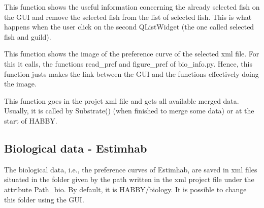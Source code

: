 \documentclass[letterpaper,10pt,english]{sphinxmanual}
\begin{document}
\begin{fulllineitems}
\begin{fulllineitems}
\end{fulllineitems}


\begin{fulllineitems}
\label{\detokenize{index:src_GUI.bio_info_GUI.BioInfo.show_info_fish_sel}}
This function shows the useful information concerning the already selected fish on the GUI and
remove the selected fish from the list of selected fish. This is what happens when the user click on the
second QListWidget (the one called selected fish and guild).

\end{fulllineitems}


\begin{fulllineitems}
\label{\detokenize{index:src_GUI.bio_info_GUI.BioInfo.show_pref}}
This function shows the image of the preference curve of the selected xml file. For this it calls, the functions
read\_pref and figure\_pref of bio\_info.py. Hence, this function justs makes the link between the GUI and
the functions effectively doing the image.

\end{fulllineitems}


\begin{fulllineitems}
\label{\detokenize{index:src_GUI.bio_info_GUI.BioInfo.update_merge_list}}
This function goes in the projet xml file and gets all available merged data. Usually, it is called
by Substrate() (when finished to merge some data) or at the start of HABBY.

\end{fulllineitems}


\end{fulllineitems}



\subsection{Biological data - Estimhab}
\label{\detokenize{index:biological-data-estimhab}}
The biological data, i.e., the preference curves of Estimhab, are saved in xml files
situated in the folder given by the path written in the xml project file under the
attribute Path\_bio. By default, it is HABBY/biology. It is possible to change this folder
using the GUI.
\end{document}
